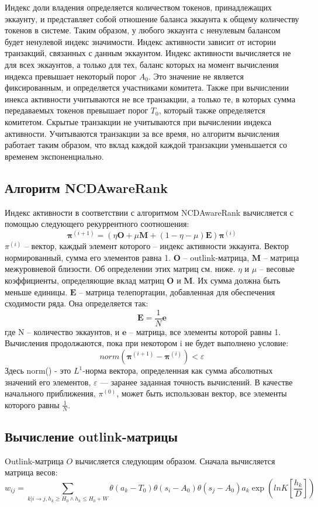 \documentclass[a4paper,12pt]{article}
\begin{document}
Индекс доли владения определяется количеством токенов, принадлежащих эккаунту, и представляет собой отношение баланса эккаунта к общему количеству токенов в системе. Таким образом, у любого эккаунта с ненулевым балансом будет ненулевой индекс значимости. Индекс активности зависит от истории транзакций, связанных с данным эккаунтом. Индекс активности вычисляется не для всех эккаунтов, а только для тех, баланс которых на момент вычисления индекса превышает некоторый порог $A_0$. Это значение не является фиксированным, и определяется участниками комитета. Также при вычислении инекса активности учитываются не все транзакции, а только те, в которых сумма передаваемых токенов превышает порог $T_0$, который также определяется комитетом. Скрытые транзакции не учитываются при вычислении индекса активности. Учитываются транзакции за все время, но алгоритм вычисления работает таким образом, что вклад каждой каждой транзакции уменьшается со временем экспоненциально.

\subsection{Алгоритм NCDAwareRank}
Индекс активности в соответствии с алгоритмом NCDAwareRank вычисляется с помощью следующего рекуррентного соотношения:
$$
\boldsymbol{\pi}^{(i+1)} = ( \eta \boldsymbol{O} + \mu \boldsymbol{M} + ( 1 - \eta - \mu ) \boldsymbol{E} ) \boldsymbol{\pi}^{(i)}
$$
$\pi^{(i)}$ -- вектор, каждый элемент которого -- индекс активности эккаунта. Вектор нормированный, сумма его элементов равна 1.
$\boldsymbol{O}$ -- outlink-матрица, $\boldsymbol{M}$ – матрица межуровневой близости. Об определении этих матриц см. ниже.
$\eta$ и $\mu$ – весовые коэффициенты, определяющие вклад матриц $\boldsymbol{O}$ и $\boldsymbol{M}$. Их сумма должна быть меньше единицы.
$\boldsymbol{E}$ -- матрица телепортации, добавленная для обеспечения сходимости ряда. Она определяется так:
$$
\boldsymbol{E}=\frac{1}{N}\boldsymbol{e}
$$
где N -- количество эккаунтов, и $\boldsymbol{e}$ -- матрица, все элементы которой равны 1.
Вычисления продолжаются, пока при некотором i не будет выполнено условие:
$$
norm(\boldsymbol{\pi}^{(i+1)}-\boldsymbol{\pi}^{(i)})<\varepsilon
$$
Здесь norm() - это $L^1$-норма вектора, определенная как сумма абсолютных значений его элементов, $\varepsilon$ — заранее заданная точность вычислений. 
В качестве начального приближения, $\pi^{(0)}$, может быть использован вектор, все элементы которого равны $\frac{1}{N}$.

\subsection{Вычисление outlink-матрицы}
Outlink-матрица $O$ вычисляется следующим образом. Сначала вычисляется матрица весов:
$$
w_{ij}=\sum_{k|i \to j, {h_k \ge H_0} \land {h_k \le H_0+W}} \theta ( a_k - T_0 ) \theta ( s_i - A_0 ) \theta ( s_j - A_0 ) a_k \exp{(lnK [\frac{h_k}{D}])}
$$
\end{document}
